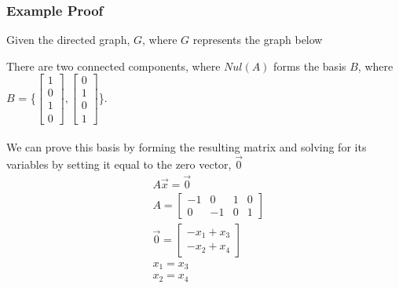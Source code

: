 \subsubsection{Example Proof}
Given the directed graph, $G$, where $G$ represents the graph below 
\begin{center}
\end{center}
There are two connected components, where $Nul(A)$ forms the basis $B$, where $B$ =  
\{$\begin{bmatrix}1 \\ 0 \\ 1 \\ 0\end{bmatrix}, \begin{bmatrix}0 \\ 1 \\ 0 \\ 1 
\end{bmatrix}$\}. \\\\
We can prove this basis by forming the resulting matrix and solving for its variables by setting it equal to the zero vector, $\vec{0}$
\[
  \begin{aligned}
    &A\vec{x} = \vec{0} \\ 
    &A = \begin{bmatrix}
        -1 & 0 & 1 & 0 \\ 
        0 & -1 & 0 & 1
    \end{bmatrix} \\
    &\vec{0} = \begin{bmatrix}
      -x_1 + x_3 \\
      -x_2 + x_4 
    \end{bmatrix} \\
    &x_1 = x_3 \\ 
    &x_2 = x_4
  \end{aligned}
\]
